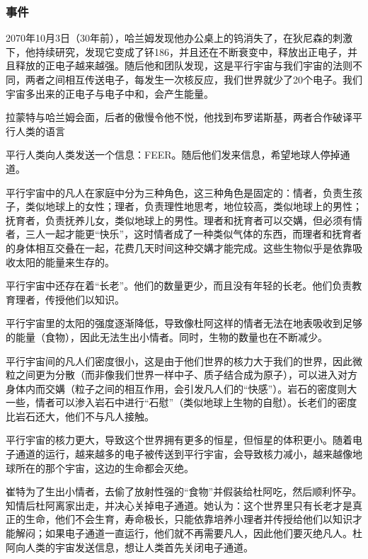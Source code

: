 \subsubsection{事件}
\begin{itemize*}
	\item 2070年10月3日（30年前），哈兰姆发现他办公桌上的钨消失了，在狄尼森的刺激下，他持续研究，发现它变成了钚186，并且还在不断衰变中，释放出正电子，并且释放的正电子越来越强。随后他和团队发现，这是平行宇宙与我们宇宙的法则不同，两者之间相互传送电子，每发生一次核反应，我们世界就少了20个电子。我们宇宙多出来的正电子与电子中和，会产生能量。
	\item 拉蒙特与哈兰姆会面，后者的傲慢令他不悦，他找到布罗诺斯基，两者合作破译平行人类的语言
	\item 平行人类向人类发送一个信息：FEER。随后他们发来信息，希望地球人停掉通道。
	\item 平行宇宙中的凡人在家庭中分为三种角色，这三种角色是固定的：情者，负责生孩子，类似地球上的女性；理者，负责理性地思考，地位较高，类似地球上的男性；抚育者，负责抚养儿女，类似地球上的男性。理者和抚育者可以交媾，但必须有情者，三人一起才能更“快乐”，这时情者成了一种类似气体的东西，而理者和抚育者的身体相互交叠在一起，花费几天时间这种交媾才能完成。这些生物似乎是依靠吸收太阳的能量来生存的。
	\item 平行宇宙中还存在着“长老”。他们的数量更少，而且没有年轻的长老。他们负责教育理者，传授他们以知识。
	\item 平行宇宙里的太阳的强度逐渐降低，导致像杜阿这样的情者无法在地表吸收到足够的能量（食物），因此无法生出小情者。同时，生物的数量也在不断减少。
	\item 平行宇宙间的凡人们密度很小，这是由于他们世界的核力大于我们的世界，因此微粒之间更为分散（而非像我们世界一样中子、质子结合成为原子），可以进入对方身体内而交媾（粒子之间的相互作用，会引发凡人们的“快感”）。岩石的密度则大一些，情者可以渗入岩石中进行“石慰”（类似地球上生物的自慰）。长老们的密度比岩石还大，他们不与凡人接触。
	\item 平行宇宙的核力更大，导致这个世界拥有更多的恒星，但恒星的体积更小。随着电子通道的运行，越来越多的电子被传送到平行宇宙，会导致核力减小，越来越像地球所在的那个宇宙，这边的生命都会灭绝。
	\item 崔特为了生出小情者，去偷了放射性强的“食物”并假装给杜阿吃，然后顺利怀孕。知情后杜阿离家出走，并决心关掉电子通道。她认为：这个世界里只有长老才是真正的生命，他们不会生育，寿命极长，只能依靠培养小理者并传授给他们以知识才能解闷；如果电子通道一直运行，他们就不再需要凡人，因此他们要灭绝凡人。杜阿向人类的宇宙发送信息，想让人类首先关闭电子通道。

\end{itemize*}

